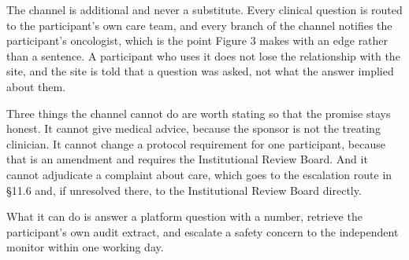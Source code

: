 The channel is additional and never a substitute. Every clinical question is
routed to the participant's own care team, and every branch of the channel
notifies the participant's oncologist, which is the point Figure 3 makes with an
edge rather than a sentence. A participant who uses it does not lose the
relationship with the site, and the site is told that a question was asked, not
what the answer implied about them.

Three things the channel cannot do are worth stating so that the promise stays
honest. It cannot give medical advice, because the sponsor is not the treating
clinician. It cannot change a protocol requirement for one participant, because
that is an amendment and requires the Institutional Review Board. And it cannot
adjudicate a complaint about care, which goes to the escalation route in \S 11.6
and, if unresolved there, to the Institutional Review Board directly.

What it can do is answer a platform question with a number, retrieve the
participant's own audit extract, and escalate a safety concern to the
independent monitor within one working day.
